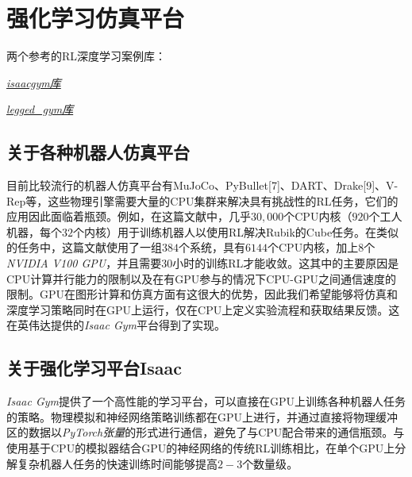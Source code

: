 
\chapter[强化学习仿真平台]{强化学习仿真平台}
\begin{note}
  两个参考的RL深度学习案例库：

  \emph{\href{https://github.com/DaojiePENG}{isaacgym库}}

  \emph{\href{https://github.com/DaojiePENG}{legged\_gym库}}
\end{note}

\section[关于各种机器人仿真平台]{关于各种机器人仿真平台}
目前比较流行的机器人仿真平台有MuJoCo\cite[p]{Todorov_Erez_Tassa_2012}、PyBullet[7]、DART\cite[p]{Lee_X_Grey_Ha_Kunz_Jain_Ye_S_Srinivasa_Stilman_Karen_Liu_2018}、Drake[9]、V-Rep\cite[p]{Rohmer_Singh_Freese_2013}等，这些物理引擎需要大量的CPU集群来解决具有挑战性的RL任务，它们的应用因此面临着瓶颈。例如，在这篇文献\cite[p]{OpenAI_Akkaya_Andrychowicz_Chociej_Litwin_McGrew_Petron_Paino_Plappert_Powell_et_al_2019}中，几乎$30,000$个CPU内核（$920$个工人机器，每个$32$个内核）用于训练机器人以使用RL解决Rubik的Cube任务。在类似的任务中，这篇文献\cite[p]{Andrychowicz_Baker_Chociej_Józefowicz_McGrew_Pachocki_Petron_Plappert_Powell_Ray_et_al_2020}使用了一组$384$个系统，具有$6144$个CPU内核，加上$8$个\emph{NVIDIA V100 GPU}，并且需要$30$小时的训练RL才能收敛。这其中的主要原因是CPU计算并行能力的限制以及在有GPU参与的情况下CPU-GPU之间通信速度的限制。GPU在图形计算和仿真方面有这很大的优势，因此我们希望能够将仿真和深度学习策略同时在GPU上运行，仅在CPU上定义实验流程和获取结果反馈。这在英伟达提供的\emph{Isaac Gym}平台得到了实现。


\section[强化学习平台Isaac]{关于强化学习平台Isaac\cite[p4-10]{Makoviychuk_Wawrzyniak_Guo_Lu_Storey_Macklin_Hoeller_Rudin_Allshire_Handa_et_al_2021}}


\emph{Isaac Gym}提供了一个高性能的学习平台，可以直接在GPU上训练各种机器人任务的策略。物理模拟和神经网络策略训练都在GPU上进行，并通过直接将物理缓冲区的数据以\emph{PyTorch张量}的形式进行通信，避免了与CPU配合带来的通信瓶颈。与使用基于CPU的模拟器结合GPU的神经网络的传统RL训练相比，在单个GPU上分解复杂机器人任务的快速训练时间能够提高$2-3$个数量级\cite[p1]{Makoviychuk_Wawrzyniak_Guo_Lu_Storey_Macklin_Hoeller_Rudin_Allshire_Handa_et_al_2021}。


